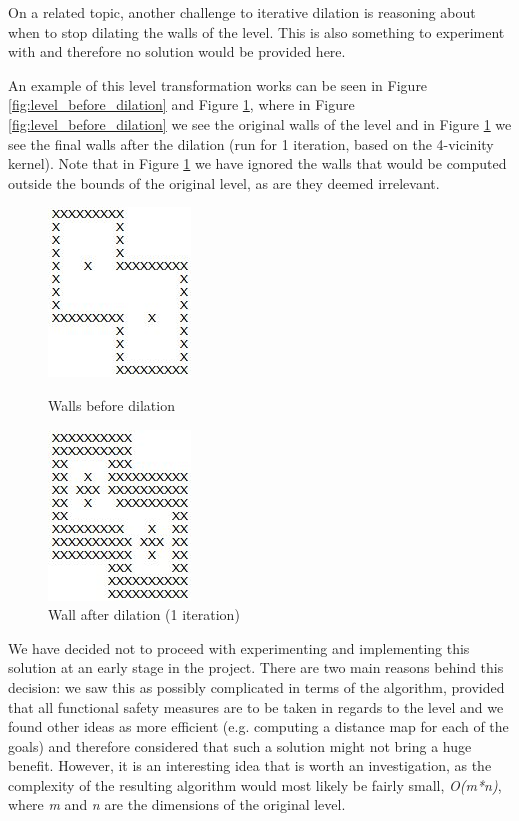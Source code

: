 \documentclass[letterpaper]{article}
\begin{document}
On a related topic, another challenge to iterative dilation is reasoning about when to stop dilating the walls of the level. This is also something to experiment with and therefore no solution would be provided here.

An example of this level transformation works can be seen in Figure \ref{fig:level_before_dilation} and Figure \ref{fig:level_after_dilation}, where in Figure \ref{fig:level_before_dilation} we see the original walls of the level and in Figure \ref{fig:level_after_dilation} we see the final walls after the dilation (run for 1 iteration, based on the 4-vicinity kernel). Note that in Figure \ref{fig:level_after_dilation} we have ignored the walls that would be computed outside the bounds of the original level, as are they deemed irrelevant.

\begin{figure}[!htb]
\centering
\begin{minipage}[b]{0.45\linewidth}
	\centering
	\includegraphics[scale=0.4]{level_before_dilation.JPG}
	\caption{Walls before dilation}
	\label{fig:level_before_dilation}
\end{minipage}
\quad
\begin{minipage}[b]{0.45\linewidth}
	\centering
	\includegraphics[scale=0.5]{level_after_dilation.JPG}
	\caption{Wall after dilation (1 iteration)}
	\label{fig:level_after_dilation}
\end{minipage}
\end{figure}

We have decided not to proceed with experimenting and implementing this solution at an early stage in the project. There are two main reasons behind this decision: we saw this as possibly complicated in terms of the algorithm, provided that all functional safety measures are to be taken in regards to the level and we found other ideas as more efficient (e.g. computing a distance map for each of the goals) and therefore considered that such a solution might not bring a huge benefit. However, it is an interesting idea that is worth an investigation, as the complexity of the resulting algorithm would most likely be fairly small, \textit{O(m*n)}, where \textit{m} and \textit{n} are the dimensions of the original level.
\end{document}
